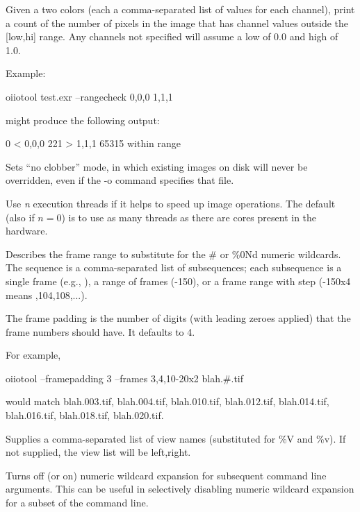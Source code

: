 Given a two colors (each a comma-separated list of values for each
channel), print a count of the number of pixels in the image that has
channel values outside the [low,hi] range.  Any channels not
specified will assume a low of 0.0 and high of 1.0.

\noindent Example:

\begin{code}
    oiiotool test.exr --rangecheck 0,0,0 1,1,1
\end{code}
\noindent might produce the following output:
\begin{code}
     0  < 0,0,0
   221  > 1,1,1
 65315  within range
\end{code}
\apiend

Sets ``no clobber'' mode, in which existing images on disk will never be 
overridden, even if the {\cf -o} command specifies that file.
\apiend

Use \emph{n} execution threads if it helps to speed up image operations.
The default (also if $n=0$) is to use as many threads as there are cores
present in the hardware.
\apiend

Describes the frame range to substitute for the {\cf \#} or {\cf \%0Nd} 
numeric wildcards.  The
sequence is a comma-separated list of subsequences; each subsequence
is a single frame (e.g., {}), a range of frames ({-150}),
or a frame range with step ({-150x4} means {,104,108,...}).

The frame padding is the number of digits (with leading zeroes applied)
that the frame numbers should have.  It defaults to 4.

For example,
\begin{code}
    oiiotool --framepadding 3 --frames 3,4,10-20x2 blah.#.tif
\end{code}
\noindent would match {\cf blah.003.tif}, {\cf blah.004.tif},
{\cf blah.010.tif}, {\cf blah.012.tif}, 
{\cf blah.014.tif}, {\cf blah.016.tif}, {\cf blah.018.tif}, 
{\cf blah.020.tif}.
\apiend

Supplies a comma-separated list of view names (substituted for {\cf \%V}
and {\cf \%v}). If not supplied, the view list will be {\cf left,right}.
\apiend

Turns off (or on) numeric wildcard expansion for subsequent command
line arguments. This can be useful in selectively disabling numeric wildcard
expansion for a subset of the command line.
\apiend

